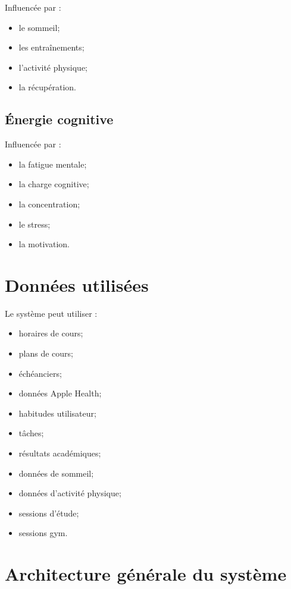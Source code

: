 \documentclass[12pt]{article}
\begin{document}
Influencée par :
\begin{itemize}
    \item le sommeil;
    \item les entraînements;
    \item l’activité physique;
    \item la récupération.
\end{itemize}

\subsection{Énergie cognitive}

Influencée par :
\begin{itemize}
    \item la fatigue mentale;
    \item la charge cognitive;
    \item la concentration;
    \item le stress;
    \item la motivation.
\end{itemize}

\section{Données utilisées}

Le système peut utiliser :
\begin{itemize}
    \item horaires de cours;
    \item plans de cours;
    \item échéanciers;
    \item données Apple Health;
    \item habitudes utilisateur;
    \item tâches;
    \item résultats académiques;
    \item données de sommeil;
    \item données d’activité physique;
    \item sessions d’étude;
    \item sessions gym.
\end{itemize}

\section{Architecture générale du système}
\end{document}
